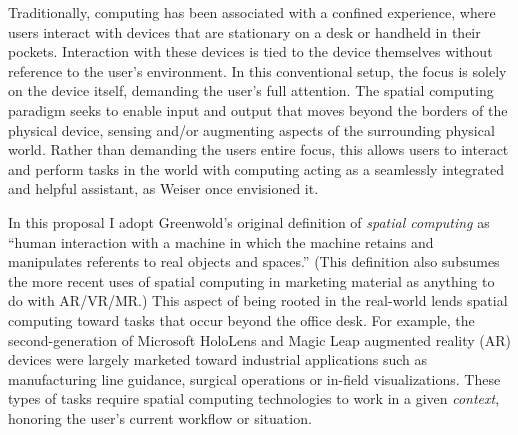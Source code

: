 \documentclass [11pt, proquest] {uwthesis}[2020/02/24]
\begin{document}
Traditionally, computing has been associated with a confined experience, where users interact with devices that are stationary on a desk or handheld in their pockets. Interaction with these devices is tied to the device themselves without reference to the user’s environment. In this conventional setup, the focus is solely on the device itself, demanding the user's full attention. The spatial computing paradigm seeks to enable input and output that moves beyond the borders of the physical device, sensing and/or augmenting aspects of the surrounding physical world. Rather than demanding the users entire focus, this allows users to interact and perform tasks in the world with computing acting as a seamlessly integrated and helpful assistant, as Weiser once envisioned it.


In this proposal I adopt Greenwold’s original definition of \textit{spatial computing} as ``human interaction with a machine in which the machine retains and manipulates referents to real objects and spaces.'' (This definition also subsumes the more recent uses of spatial computing in marketing material as anything to do with AR/VR/MR.) This aspect of being rooted in the real-world lends spatial computing toward tasks that occur beyond the office desk. For example, the second-generation of Microsoft HoloLens and Magic Leap augmented reality (AR) devices were largely marketed toward industrial applications such as manufacturing line guidance, surgical operations or in-field visualizations. These types of tasks require spatial computing technologies to work in a given \textit{context}, honoring the user’s current workflow or situation. 
 
 
 
\end{document}
